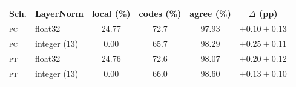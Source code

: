 \setlength{\tabcolsep}{4pt}
\begin{tabular}{llcccc}
\toprule
Sch. & LayerNorm & local (\%) & codes (\%) & agree (\%) & $\Delta$ (pp) \\
\midrule
\textsc{pc} & float32 & 24.77 & 72.7 & 97.93 & $+0.10\pm0.13$ \\
\textsc{pc} & integer (13) & 0.00 & 65.7 & 98.29 & $+0.25\pm0.11$ \\
\textsc{pt} & float32 & 24.76 & 72.6 & 98.07 & $+0.20\pm0.12$ \\
\textsc{pt} & integer (13) & 0.00 & 66.0 & 98.60 & $+0.13\pm0.10$ \\
\bottomrule
\end{tabular}
